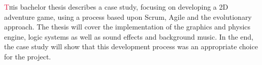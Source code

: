 
\lettrine[lines=1,slope=-2pt,nindent=-4pt]{\textcolor{Crimson}{T}{}}his bachelor thesis describes a case study, focusing on developing a 2D adventure game, using a process based upon Scrum, Agile and the evolutionary approach. The thesis will cover the implementation of the graphics and physics engine, logic systems as well as sound effects and background music. In the end, the case study will show that this development process was an appropriate choice for the project.